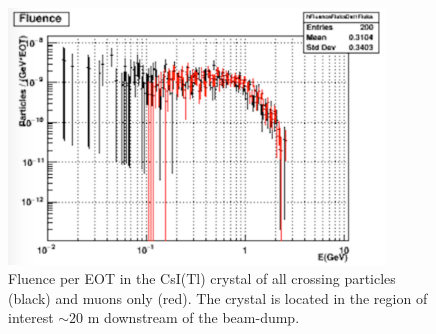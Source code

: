 \begin{figure}[h!] 
\center
\includegraphics[width=10cm]{figs/fluence.pdf}   
\caption{Fluence per EOT in the  CsI(Tl) crystal of  all crossing particles (black) and muons only (red). The crystal is located in the region of interest $\sim 20$ m downstream of the beam-dump. }
\label{fig:bg-csi}
\end{figure}

